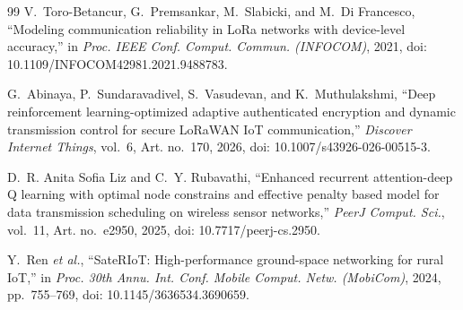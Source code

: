 \begin{thebibliography}{99}
 V.~Toro-Betancur, G.~Premsankar, M.~Slabicki, and M.~Di Francesco, ``Modeling communication reliability in LoRa networks with device-level accuracy,'' in \emph{Proc. IEEE Conf. Comput. Commun. (INFOCOM)}, 2021, doi: 10.1109/INFOCOM42981.2021.9488783.

 G.~Abinaya, P.~Sundaravadivel, S.~Vasudevan, and K.~Muthulakshmi, ``Deep reinforcement learning-optimized adaptive authenticated encryption and dynamic transmission control for secure LoRaWAN IoT communication,'' \emph{Discover Internet Things}, vol.~6, Art. no.~170, 2026, doi: 10.1007/s43926-026-00515-3.

 D.~R. Anita Sofia Liz and C.~Y. Rubavathi, ``Enhanced recurrent attention-deep Q learning with optimal node constrains and effective penalty based model for data transmission scheduling on wireless sensor networks,'' \emph{PeerJ Comput. Sci.}, vol.~11, Art. no.~e2950, 2025, doi: 10.7717/peerj-cs.2950.

 Y.~Ren \emph{et al.}, ``SateRIoT: High-performance ground-space networking for rural IoT,'' in \emph{Proc. 30th Annu. Int. Conf. Mobile Comput. Netw. (MobiCom)}, 2024, pp.~755--769, doi: 10.1145/3636534.3690659.

\end{thebibliography}
